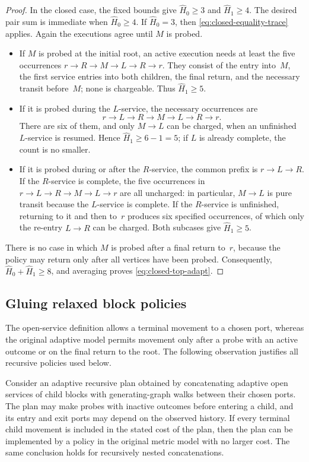 \documentclass[12pt,a4paper,oneside]{report}
\begin{document}
\begin{proof}
In the closed case, the fixed bounds give $\widehat H_0\ge3$ and
$\widehat H_1\ge4$.  The desired pair sum is immediate when
$\widehat H_0\ge4$.  If $\widehat H_0=3$, then
\cref{eq:closed-equality-trace} applies.  Again the executions agree until
$M$ is probed.
\begin{itemize}
    \item If $M$ is probed at the initial root, an active execution needs at
    least the five occurrences $r\to R\to M\to L\to R\to r$.  They consist
    of the entry into~$M$, the first service entries into both children, the
    final return, and the necessary transit before~$M$; none is chargeable.
    Thus $\widehat H_1\ge5$.
    \item If it is probed during the $L$-service, the necessary occurrences
    are
    \[
        r\to L\to R\to M\to L\to R\to r.
    \]
    There are six of them, and only $M\to L$ can be charged, when an
    unfinished $L$-service is resumed.  Hence
    $\widehat H_1\ge6-1=5$; if $L$ is already complete, the count is no
    smaller.
    \item If it is probed during or after the $R$-service, the common prefix is
    $r\to L\to R$.  If the $R$-service is complete, the five occurrences in
    $r\to L\to R\to M\to L\to r$ are all uncharged: in particular,
    $M\to L$ is pure transit because the $L$-service is complete.  If the
    $R$-service is unfinished, returning to it and then to~$r$ produces six
    specified occurrences, of which only the re-entry $L\to R$ can be
    charged.  Both subcases give $\widehat H_1\ge5$.
\end{itemize}
There is no case in which $M$ is probed after a final return to~$r$, because
the policy may return only after all vertices have been probed.  Consequently,
$\widehat H_0+\widehat H_1\ge8$, and averaging proves
\cref{eq:closed-top-adapt}.
\end{proof}

\subsection{Gluing relaxed block policies}\label{sec:recursive-gluing}

The open-service definition allows a terminal movement to a chosen port,
whereas the original adaptive model permits movement only after a probe with
an active outcome
or on the final return to the root.  The following observation justifies all
recursive policies used below.

\begin{lemma}\label{lem:block-policy-gluing}
Consider an adaptive recursive plan obtained by concatenating adaptive open
services of child blocks with generating-graph walks between their chosen
ports.  The plan may make probes with inactive outcomes before entering a child, and its
entry and exit ports may depend on the observed history.  If every terminal
child movement is included in the stated cost of the plan, then the plan can
be implemented by a policy in the original metric model with no larger cost.
The same conclusion holds for recursively nested concatenations.
\end{lemma}
\end{document}

